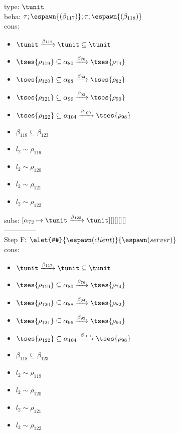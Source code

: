 \documentclass[12pt]{article}
\begin{document}
  type: $ \tunit $ 
\\  beha: $ \tau; \espawn{ (\beta_{117})}; \tau; \espawn{ (\beta_{118})} $ 
\\  cons: \begin{itemize}
\item $ \tunit \xrightarrow{\beta_{117}} \tunit \subseteq \tunit $
\item $  \tses{ \rho_{119}} \subseteq \alpha_{80} \xrightarrow{\beta_{76}}  \tses{ \rho_{74}} $
\item $  \tses{ \rho_{120}} \subseteq \alpha_{88} \xrightarrow{\beta_{84}}  \tses{ \rho_{82}} $
\item $  \tses{ \rho_{121}} \subseteq \alpha_{96} \xrightarrow{\beta_{92}}  \tses{ \rho_{90}} $
\item $  \tses{ \rho_{122}} \subseteq \alpha_{104} \xrightarrow{\beta_{100}}  \tses{ \rho_{98}} $
\item $ \beta_{118} \subseteq \beta_{123} $
\item $ l_{2} \sim\rho_{119} $
\item $ l_{2} \sim\rho_{120} $
\item $ l_{2} \sim\rho_{121} $
\item $ l_{2} \sim\rho_{122} $
\end{itemize} 
  subs:  $ [ \alpha_{72}\mapsto\tunit \xrightarrow{\beta_{123}} \tunit] [] [] [] [] $  
 \\--------------\\ 
Step F: $ \elet{#}{\espawn (client)}{\espawn (server)} $
 \\ cons: \begin{itemize}
\item $ \tunit \xrightarrow{\beta_{117}} \tunit \subseteq \tunit $
\item $  \tses{ \rho_{119}} \subseteq \alpha_{80} \xrightarrow{\beta_{76}}  \tses{ \rho_{74}} $
\item $  \tses{ \rho_{120}} \subseteq \alpha_{88} \xrightarrow{\beta_{84}}  \tses{ \rho_{82}} $
\item $  \tses{ \rho_{121}} \subseteq \alpha_{96} \xrightarrow{\beta_{92}}  \tses{ \rho_{90}} $
\item $  \tses{ \rho_{122}} \subseteq \alpha_{104} \xrightarrow{\beta_{100}}  \tses{ \rho_{98}} $
\item $ \beta_{118} \subseteq \beta_{123} $
\item $ l_{2} \sim\rho_{119} $
\item $ l_{2} \sim\rho_{120} $
\item $ l_{2} \sim\rho_{121} $
\item $ l_{2} \sim\rho_{122} $
\end{itemize}
\end{document}
